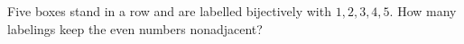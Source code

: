 Five boxes stand in a row and are labelled bijectively with $1,2,3,4,5$. How many labelings keep the even numbers nonadjacent?
